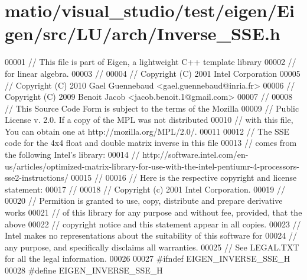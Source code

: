 \hypertarget{matio_2visual__studio_2test_2eigen_2_eigen_2src_2_l_u_2arch_2_inverse___s_s_e_8h_source}{}\section{matio/visual\+\_\+studio/test/eigen/\+Eigen/src/\+L\+U/arch/\+Inverse\+\_\+\+S\+SE.h}
\label{matio_2visual__studio_2test_2eigen_2_eigen_2src_2_l_u_2arch_2_inverse___s_s_e_8h_source}

\begin{DoxyCode}
00001 \textcolor{comment}{// This file is part of Eigen, a lightweight C++ template library}
00002 \textcolor{comment}{// for linear algebra.}
00003 \textcolor{comment}{//}
00004 \textcolor{comment}{// Copyright (C) 2001 Intel Corporation}
00005 \textcolor{comment}{// Copyright (C) 2010 Gael Guennebaud <gael.guennebaud@inria.fr>}
00006 \textcolor{comment}{// Copyright (C) 2009 Benoit Jacob <jacob.benoit.1@gmail.com>}
00007 \textcolor{comment}{//}
00008 \textcolor{comment}{// This Source Code Form is subject to the terms of the Mozilla}
00009 \textcolor{comment}{// Public License v. 2.0. If a copy of the MPL was not distributed}
00010 \textcolor{comment}{// with this file, You can obtain one at http://mozilla.org/MPL/2.0/.}
00011 
00012 \textcolor{comment}{// The SSE code for the 4x4 float and double matrix inverse in this file}
00013 \textcolor{comment}{// comes from the following Intel's library:}
00014 \textcolor{comment}{//
       http://software.intel.com/en-us/articles/optimized-matrix-library-for-use-with-the-intel-pentiumr-4-processors-sse2-instructions/}
00015 \textcolor{comment}{//}
00016 \textcolor{comment}{// Here is the respective copyright and license statement:}
00017 \textcolor{comment}{//}
00018 \textcolor{comment}{//   Copyright (c) 2001 Intel Corporation.}
00019 \textcolor{comment}{//}
00020 \textcolor{comment}{// Permition is granted to use, copy, distribute and prepare derivative works}
00021 \textcolor{comment}{// of this library for any purpose and without fee, provided, that the above}
00022 \textcolor{comment}{// copyright notice and this statement appear in all copies.}
00023 \textcolor{comment}{// Intel makes no representations about the suitability of this software for}
00024 \textcolor{comment}{// any purpose, and specifically disclaims all warranties.}
00025 \textcolor{comment}{// See LEGAL.TXT for all the legal information.}
00026 
00027 \textcolor{preprocessor}{#ifndef EIGEN\_INVERSE\_SSE\_H}
00028 \textcolor{preprocessor}{#define EIGEN\_INVERSE\_SSE\_H}

\end{DoxyCode}
